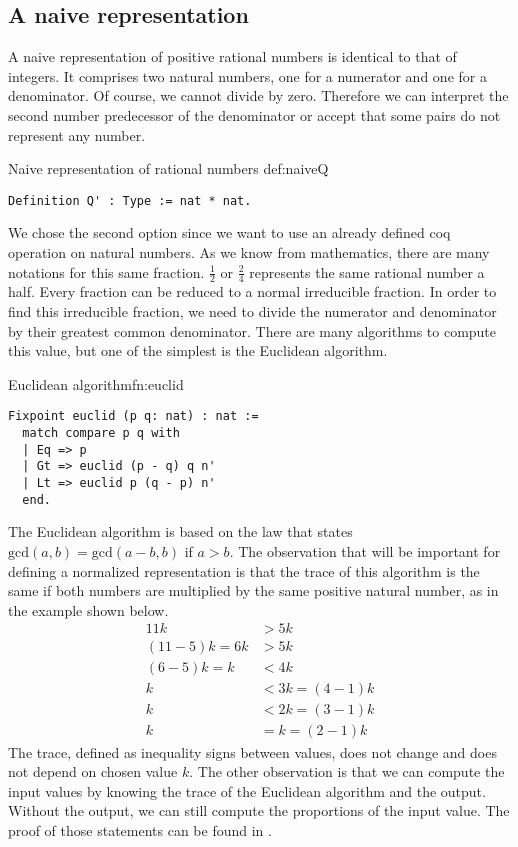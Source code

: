 \subsection{A naive representation}
A naive representation of positive rational numbers is identical to that of integers. It comprises two natural numbers, one for a numerator and one for a denominator. Of course, we cannot divide by zero. Therefore we can interpret the second number predecessor of the denominator or accept that some pairs do not represent any number.
\begin{defi}{Naive representation of rational numbers }{def:naiveQ}
\begin{verbatim}
Definition Q' : Type := nat * nat.
\end{verbatim}
\end{defi}
We chose the second option since we want to use an already defined coq operation on natural numbers. As we know from mathematics, there are many notations for this same fraction. $\frac{1}{2}$ or $\frac{2}{4}$ represents the same rational number a half. Every fraction can be reduced to a normal irreducible fraction. In order to find this irreducible fraction, we need to divide the numerator and denominator by their greatest common denominator. There are many algorithms to compute this value, but one of the simplest is the Euclidean algorithm.
\begin{func}{Euclidean algorithm}{fn:euclid}
\begin{verbatim}
Fixpoint euclid (p q: nat) : nat :=
  match compare p q with
  | Eq => p
  | Gt => euclid (p - q) q n'
  | Lt => euclid p (q - p) n'
  end.
\end{verbatim}
\end{func}
The Euclidean algorithm is based on the law that states $\textrm{gcd}(a, b) = \textrm{gcd}(a - b, b)$ if $a > b$. The observation that will be important for defining a normalized representation is that the trace of this algorithm is the same if both numbers are multiplied by the same positive natural number, as in the example shown below.
\begin{equation}
    \begin{split}
        11k&>5k\\
        (11-5)k=6k&>5k\\
        (6-5)k=k&<4k\\
        k&<3k=(4-1)k\\
        k&<2k=(3-1)k\\
        k&=k=(2-1)k
    \end{split}
\end{equation}
The trace,  defined as inequality signs between values, does not change and does not depend on chosen value $k$. The other observation is that we can compute the input values by knowing the trace of the Euclidean algorithm and the output. Without the output, we can still compute the proportions of the input value. The proof of those statements can be found in .
